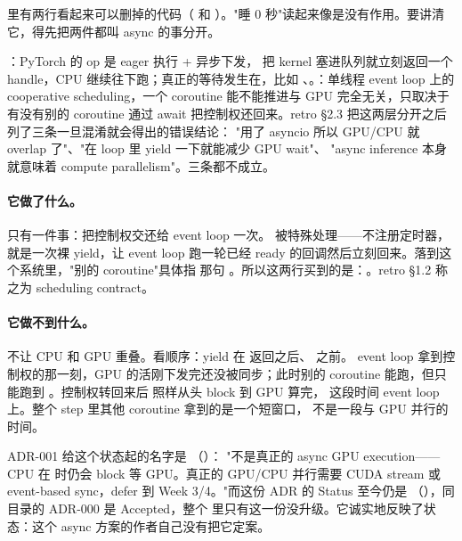  里有两行看起来可以删掉的代码（
和 ）。"睡 0 秒"读起来像是没有作用。要讲清它，得先把两件都叫 async 的事分开。

：PyTorch 的 op 是 eager 执行 + 异步下发， 把 kernel
塞进队列就立刻返回一个 handle，CPU 继续往下跑；真正的等待发生在，比如
、。：单线程 event loop 上的
cooperative scheduling，一个 coroutine 能不能推进与 GPU 完全无关，只取决于有没有别的 coroutine
通过 await 把控制权还回来。retro §2.3 把这两层分开之后列了三条一旦混淆就会得出的错误结论：
"用了 asyncio 所以 GPU/CPU 就 overlap 了"、"在 loop 里 yield 一下就能减少 GPU wait"、
"async inference 本身就意味着 compute parallelism"。三条都不成立。

\paragraph{它做了什么。}
只有一件事：把控制权交还给 event loop 一次。 被特殊处理——不注册定时器，
就是一次裸 yield，让 event loop 跑一轮已经 ready 的回调然后立刻回来。落到这个系统里，"别的
coroutine"具体指  那句
。所以这两行买到的是：。retro §1.2 称之为 scheduling contract。

\paragraph{它做不到什么。}
不让 CPU 和 GPU 重叠。看顺序：yield 在  返回之后、 之前。
event loop 拿到控制权的那一刻，GPU 的活刚下发完还没被同步；此时别的 coroutine 能跑，但只能跑到
。控制权转回来后  照样从头 block 到 GPU 算完，
这段时间 event loop 上。整个 step 里其他 coroutine 拿到的是一个短窗口，
不是一段与 GPU 并行的时间。

ADR-001 给这个状态起的名字是 （）：
"不是真正的 async GPU execution——CPU 在  时仍会 block 等 GPU。真正的
GPU/CPU 并行需要 CUDA stream 或 event-based sync，defer 到 Week 3/4。"而这份 ADR 的 Status
至今仍是 （），同目录的 ADR-000
是 Accepted，整个  里只有这一份没升级。它诚实地反映了状态：这个 async
方案的作者自己没有把它定案。

